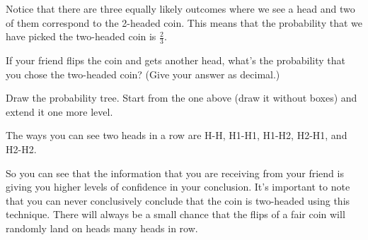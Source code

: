 \documentclass{ximera}
\begin{document}
\begin{image}
\end{image}

Notice that there are three equally likely outcomes where we see a head and two of them correspond to the 2-headed coin. This means that the probability that we have picked the two-headed coin is $\frac{2}{3}$.

\begin{question}
If your friend flips the coin and gets another head, what's the probability that you chose the two-headed coin? (Give your answer as decimal.)
  \begin{solution}
    \begin{hint}
      Draw the probability tree. Start from the one above (draw it without boxes) and extend it one more level.
    \end{hint}
    \begin{hint}
      The ways you can see two heads in a row are H-H, H1-H1, H1-H2, H2-H1, and H2-H2.
    \end{hint}
  \end{solution}
\end{question}

So you can see that the information that you are receiving from your friend is giving you higher levels of confidence in your conclusion. It's important to note that you can never conclusively conclude that the coin is two-headed using this technique. There will always be a small chance that the flips of a fair coin will randomly land on heads many heads in row.
\end{document}
